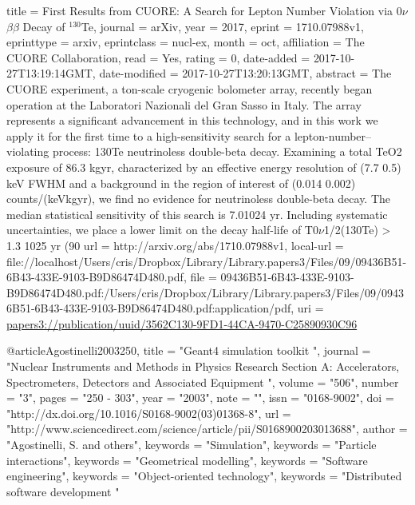 {{{title = {{First Results from CUORE: A Search for Lepton Number Violation via 0$\nu$$\beta$$\beta$ Decay of $^{130}$Te}},
journal = {arXiv},
year = {2017},
eprint = {1710.07988v1},
eprinttype = {arxiv},
eprintclass = {nucl-ex},
month = oct,
affiliation = {The CUORE Collaboration},
read = {Yes},
rating = {0},
date-added = {2017-10-27T13:19:14GMT},
date-modified = {2017-10-27T13:20:13GMT},
abstract = {The CUORE experiment, a ton-scale cryogenic bolometer array, recently began operation at the Laboratori Nazionali del Gran Sasso in Italy. The array represents a significant advancement in this technology, and in this work we apply it for the first time to a high-sensitivity search for a lepton-number--violating process: 130Te neutrinoless double-beta decay. Examining a total TeO2 exposure of 86.3 kgyr, characterized by an effective energy resolution of (7.7  0.5) keV FWHM and a background in the region of interest of (0.014  0.002) counts/(keVkgyr), we find no evidence for neutrinoless double-beta decay. The median statistical sensitivity of this search is 7.01024 yr. Including systematic uncertainties, we place a lower limit on the decay half-life of T0$\nu$1/2(130Te) > 1.3 1025 yr (90%
url = {http://arxiv.org/abs/1710.07988v1},
local-url = {file://localhost/Users/cris/Dropbox/Library/Library.papers3/Files/09/09436B51-6B43-433E-9103-B9D86474D480.pdf},
file = {{09436B51-6B43-433E-9103-B9D86474D480.pdf:/Users/cris/Dropbox/Library/Library.papers3/Files/09/09436B51-6B43-433E-9103-B9D86474D480.pdf:application/pdf}},
uri = {\url{papers3://publication/uuid/3562C130-9FD1-44CA-9470-C25890930C96}}
}

@article{Agostinelli2003250,
title = "Geant4 simulation toolkit ",
journal = "Nuclear Instruments and Methods in Physics Research Section A: Accelerators, Spectrometers, Detectors and Associated Equipment ",
volume = "506",
number = "3",
pages = "250 - 303",
year = "2003",
note = "",
issn = "0168-9002",
doi = "http://dx.doi.org/10.1016/S0168-9002(03)01368-8",
url = "http://www.sciencedirect.com/science/article/pii/S0168900203013688",
author = "Agostinelli, S.  and others",
keywords = "Simulation",
keywords = "Particle interactions",
keywords = "Geometrical modelling",
keywords = "Software engineering",
keywords = "Object-oriented technology",
keywords = "Distributed software development "
}

}}}
